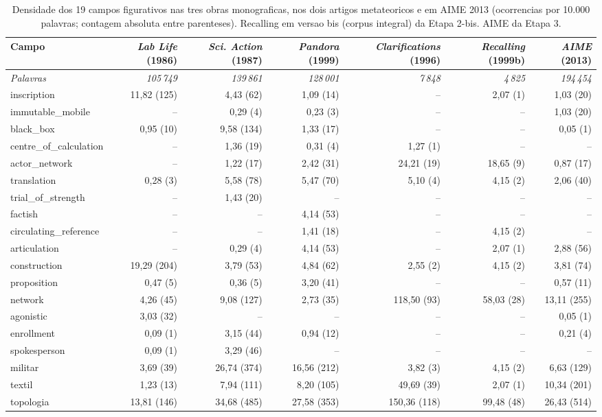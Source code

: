 \begin{table}[htbp]
\centering
\caption{Densidade dos 19 campos figurativos nas tres obras monograficas, nos dois artigos metateoricos e em AIME 2013 (ocorrencias por 10.000 palavras; contagem absoluta entre parenteses). Recalling em versao bis (corpus integral) da Etapa 2-bis. AIME da Etapa 3.}
\label{tab:figuracoes_latour_6_obras}
\scriptsize
\begin{tabular}{lrrrrrr}
\toprule
Campo & \emph{Lab Life} (1986) & \emph{Sci. Action} (1987) & \emph{Pandora} (1999) & \emph{Clarifications} (1996) & \emph{Recalling} (1999b) & \emph{AIME} (2013) \\
\midrule
\textit{Palavras} & \textit{105\,749} & \textit{139\,861} & \textit{128\,001} & \textit{7\,848} & \textit{4\,825} & \textit{194\,454} \\
\midrule
inscription & 11{,}82 (125) & 4{,}43 (62) & 1{,}09 (14) & -- & 2{,}07 (1) & 1{,}03 (20) \\
immutable\_mobile & -- & 0{,}29 (4) & 0{,}23 (3) & -- & -- & 1{,}03 (20) \\
black\_box & 0{,}95 (10) & 9{,}58 (134) & 1{,}33 (17) & -- & -- & 0{,}05 (1) \\
centre\_of\_calculation & -- & 1{,}36 (19) & 0{,}31 (4) & 1{,}27 (1) & -- & -- \\
actor\_network & -- & 1{,}22 (17) & 2{,}42 (31) & 24{,}21 (19) & 18{,}65 (9) & 0{,}87 (17) \\
translation & 0{,}28 (3) & 5{,}58 (78) & 5{,}47 (70) & 5{,}10 (4) & 4{,}15 (2) & 2{,}06 (40) \\
trial\_of\_strength & -- & 1{,}43 (20) & -- & -- & -- & -- \\
factish & -- & -- & 4{,}14 (53) & -- & -- & -- \\
circulating\_reference & -- & -- & 1{,}41 (18) & -- & 4{,}15 (2) & -- \\
articulation & -- & 0{,}29 (4) & 4{,}14 (53) & -- & 2{,}07 (1) & 2{,}88 (56) \\
construction & 19{,}29 (204) & 3{,}79 (53) & 4{,}84 (62) & 2{,}55 (2) & 4{,}15 (2) & 3{,}81 (74) \\
proposition & 0{,}47 (5) & 0{,}36 (5) & 3{,}20 (41) & -- & -- & 0{,}57 (11) \\
network & 4{,}26 (45) & 9{,}08 (127) & 2{,}73 (35) & 118{,}50 (93) & 58{,}03 (28) & 13{,}11 (255) \\
agonistic & 3{,}03 (32) & -- & -- & -- & -- & 0{,}05 (1) \\
enrollment & 0{,}09 (1) & 3{,}15 (44) & 0{,}94 (12) & -- & -- & 0{,}21 (4) \\
spokesperson & 0{,}09 (1) & 3{,}29 (46) & -- & -- & -- & -- \\
militar & 3{,}69 (39) & 26{,}74 (374) & 16{,}56 (212) & 3{,}82 (3) & 4{,}15 (2) & 6{,}63 (129) \\
textil & 1{,}23 (13) & 7{,}94 (111) & 8{,}20 (105) & 49{,}69 (39) & 2{,}07 (1) & 10{,}34 (201) \\
topologia & 13{,}81 (146) & 34{,}68 (485) & 27{,}58 (353) & 150{,}36 (118) & 99{,}48 (48) & 26{,}43 (514) \\
\bottomrule
\end{tabular}
\end{table}

